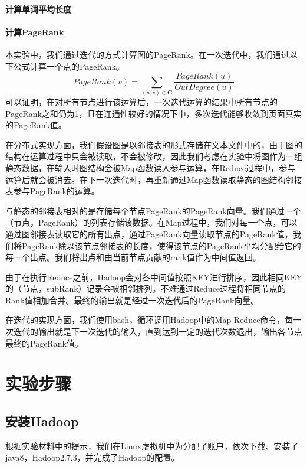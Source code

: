 \documentclass{article}
\begin{document}
\paragraph{计算单词平均长度}



\paragraph{计算PageRank}
本实验中，我们通过迭代的方式计算图的PageRank。在一次迭代中，我们通过以下公式计算一个点的PageRank。
$$ PageRank(v) = \sum_{(u,v)\in \mathbf{G}} {\frac{PageRank(u)}{OutDegree(u)}}$$
可以证明，在对所有节点进行该运算后，一次迭代运算的结果中所有节点的PageRank之和仍为1，且在连通性较好的情况下中，多次迭代能够收敛到页面真实的PageRank值。

在分布式实现方面，我们假设图是以邻接表的形式存储在文本文件中的，由于图的结构在运算过程中只会被读取，不会被修改，因此我们考虑在实验中将图作为一组静态数据，在输入时图结构会被Map函数读入参与运算，在Reduce过程中，参与运算后就会被消去。在下一次迭代时，再重新通过Map函数读取静态的图结构邻接表参与PageRank的运算。

与静态的邻接表相对的是存储每个节点PageRank的PageRank向量。我们通过一个（节点，PageRank）的列表存储该数据。在Map过程中，我们对每一个点，可以通过图邻接表读取它的所有出点，通过PageRank向量读取节点的PageRank值，我们将PageRank除以该节点邻接表的长度，使得该节点的PageRank平均分配给它的每一个出点。我们将出点和由当前节点贡献的rank值作为中间值返回。

由于在执行Reduce之前，Hadoop会对各中间值按照KEY进行排序，因此相同KEY的（节点，subRank）记录会被相邻排列。不难通过Reduce过程将相同节点的Rank值相加合并。最终的输出就是经过一次迭代后的PageRank向量。

在迭代的实现方面，我们使用bash，循环调用Hadoop中的Map-Reduce命令，每一次迭代的输出就是下一次迭代的输入，直到达到一定的迭代次数退出，输出各节点最终的PageRank值。

\section{实验步骤}

\subsection{安装Hadoop}

根据实验材料中的提示，我们在Linux虚拟机中为分配了账户，依次下载、安装了java8，Hadoop2.7.3，并完成了Hadoop的配置。
\end{document}
